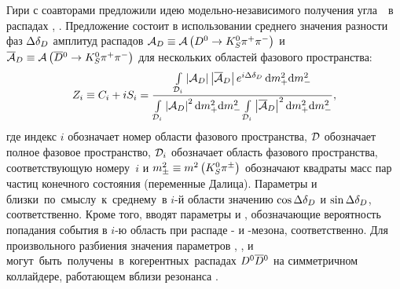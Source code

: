 Гири с соавторами предложили идею модельно-независимого получения угла~\gphi~\ut в распадах \bdk, \dkpp.  Предложение состоит в использовании среднего значения разности фаз $\Delta\delta_D$ амплитуд распадов $\mathcal{A}_D\equiv\mathcal{A}\left(D^0\to K_S^0\pi^+\pi^-\right)$ и $\overline{\mathcal{A}}_D\equiv\mathcal{A}\left(\overline{D}{}^0\to K_S^0\pi^+\pi^-\right)$ для нескольких областей фазового пространства:%
\begin{equation}\label{eq:csi}
  Z_i \equiv C_i + iS_i = 
            \frac{\int\limits_{\mathcal{D}_i}
            \left|\mathcal{A}_D\right|\left|\overline{\mathcal{A}}_D\right|
            e^{i\Delta\delta_D}\,\mathrm{d}m_+^2\mathrm{d}m_-^2}
            {\int\limits_{\mathcal{D}_i}\left|\mathcal{A}_D\right|^2 \mathrm{d}m_+^2\mathrm{d}m_-^2 
             \int\limits_{\mathcal{D}_i}\left|\overline{\mathcal{A}}_D\right|^2 \mathrm{d}m_+^2\mathrm{d}m_-^2}
            ,
\end{equation}
где индекс $i$ обозначает номер области фазового пространства, $\mathcal{D}$ обозначает полное фазовое пространство, $\mathcal{D}_i$ обозначает область фазового пространства, соответствующую номеру~$i$ и $m^2_{\pm}\equiv m^2\left(K_S^0\pi^{\pm}\right)$ обозначают квадраты масс пар частиц конечного состояния (переменные Далица).  Параметры \ci и \si близки по смыслу к среднему в $i$-й области значению $\cos\Delta\delta_D$ и $\sin\Delta\delta_D$, соответственно.  Кроме того, вводят параметры \ki и \kbi,  обозначающие вероятность попадания события в $i$-ю область при распаде \dn- и \dnbar-мезона, соответственно.  Для произвольного разбиения значения параметров \ki, \kbi, \ci и \si могут быть получены в когерентных распадах $D^0\overline{D}{}^0$ на симметричном коллайдере, работающем вблизи резонанса \ppsi.

